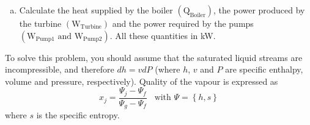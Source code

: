 \documentclass[calculator,steamtables,refrigeranttables,psychrometricchart,datasheet,solutions,resit]{exam}
\newcommand{\frc}{\displaystyle\frac}
\begin{document}
\begin{question}
\begin{enumerate}[(a)]
\item Calculate the heat supplied by the boiler $\left(\text{Q}_{\text{Boiler}}\right)$, the power produced by the turbine $\left(\text{W}_{\text{Turbine}}\right)$ and the power required by the pumps $\left(\text{W}_{\text{Pump1}}\text{ and W}_{\text{Pump2}}\right)$. All these quantities in kW.~
\end{enumerate}

To solve this problem, you should assume that the saturated liquid streams are incompressible, and therefore $dh = vdP$ (where $h$, $v$ and $P$ are specific enthalpy, volume and pressure, respectively). Quality of the vapour is expressed as
\begin{displaymath}
x_{j} = \frc{\Psi_{j}-\Psi_{f}}{\Psi_{g}-\Psi_{f}}\;\;\;\text{with }\Psi=\left\{h,s\right\}
\end{displaymath}
where $s$ is the specific entropy.

\end{question}

\clearpage
\end{document}
